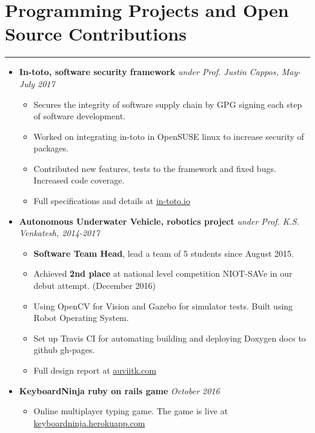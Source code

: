 \documentclass[a4paper]{article}
\begin{document}
\section*{Programming Projects and Open Source Contributions}
\hrule
\vspace{3mm}
\begin{itemize}
	\item
	      \textbf{In-toto, software security framework}
	      \hfill \textit{under Prof. Justin Cappos, May-July 2017}
	      \begin{itemize}
	      	\vspace{-2mm} \setlength\itemsep{-0.7mm}
		\item Secures the integrity of software supply chain by GPG signing each step of software development.
		\item Worked on integrating in-toto in OpenSUSE linux to increase security of packages.
		\item Contributed new features, tests to the framework and fixed bugs. Increased code coverage.
		\item Full specifications and details at \href{https://in-toto.io}{in-toto.io}
	      \end{itemize}
	\item
	      \textbf{Autonomous Underwater Vehicle, robotics project}
	      \hfill \textit{under Prof. K.S. Venkatesh, 2014-2017}
	      \begin{itemize}
	      	\vspace{-2mm} \setlength\itemsep{-0.7mm}
		\item \textbf{Software Team Head}, lead a team of 5 students since August 2015.
		\item Achieved \textbf{2nd place} at national level competition NIOT-SAVe in our debut attempt. (December 2016)
		\item Using OpenCV for Vision and Gazebo for simulator tests. Built using Robot Operating System.
		\item Set up Travis CI for automating building and deploying Doxygen docs to github gh-pages.
		\item Full design report at \href{http://auviitk.com}{auviitk.com}
	      \end{itemize}
	\item
	      \textbf{KeyboardNinja ruby on rails game}
	      \hfill \textit{October 2016}
	      \begin{itemize}
		\vspace{-2mm} \setlength\itemsep{-0.7mm}
		\item Online multiplayer typing game. The game is live at \href{https://keyboardninja.herokuapp.com}{keyboardninja.herokuapp.com}

\end{itemize}
\end{itemize}
\end{document}
